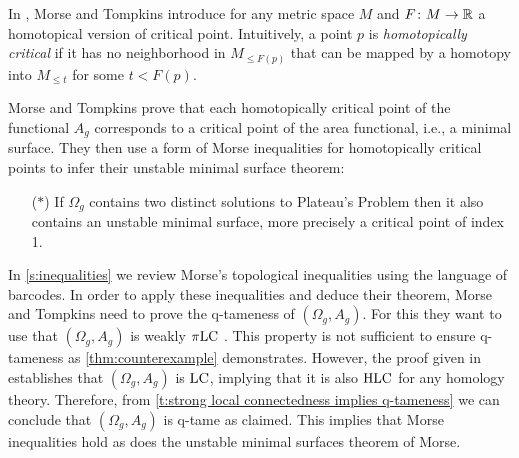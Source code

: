 In \cite[p.445]{Morse.1939}, Morse and Tompkins introduce for any metric space $M$ and $F \colon M \to \mathbb{R}$ a homotopical version of critical point.
Intuitively, a point $p$ is \textit{homotopically critical} if it has no neighborhood in $M_{\leq F(p)}$ that can be mapped by a homotopy into $M_{\leq t}$ for some $t<F(p)$.

Morse and Tompkins prove that each homotopically critical point of the functional $A_g$ corresponds to a critical point of the area functional, i.e., a minimal surface.
They then use a form of Morse inequalities for homotopically critical points
to infer their unstable minimal surface theorem:
\begin{itemize}
    \item[($\ast$)] If $\Omega_g$ contains two distinct solutions to Plateau's Problem then it also contains an unstable minimal surface, more precisely a critical point of index 1.
\end{itemize}

In \cref{s:inequalities} we review Morse's topological inequalities using the language of barcodes.
In order to apply these inequalities and deduce their theorem, Morse and Tompkins need to prove the \mbox{q-tameness} of $(\Omega_g, A_g)$. 
For this they want to use that $(\Omega_g, A_g)$ is weakly $\pi\mathrm{LC}$ \cite[p.431]{Morse.1940}. This property is not sufficient to ensure q-tameness as \cref{thm:counterexample} demonstrates.
However, the proof given in \cite[p.464]{Morse.1939} establishes that $(\Omega_g, A_g)$ is $\mathrm{LC}$, implying that it is also $\mathrm{HLC}$ for any homology theory.
Therefore, from \cref{t:strong local connectedness implies q-tameness} we can conclude that $(\Omega_g, A_g)$ is q-tame as claimed.
This implies that Morse inequalities hold as does the unstable minimal surfaces theorem of Morse.



